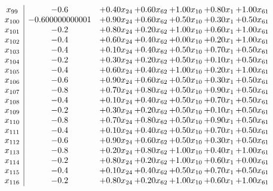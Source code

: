\documentclass[8pt]{article}
\begin{document}
\[\begin{array}{c| c c@{\hskip 2pt} c@{\hskip 2pt} c@{\hskip 2pt} c@{\hskip 2pt} c@{\hskip 2pt} }
 x_{99}   &  -0.6 & +  0.40 x_{24} & +  0.60 x_{62} & +  1.00 x_{10} & +  0.80 x_{1} & +  1.00 x_{61}\\
 x_{100}   &  -0.600000000001 & +  0.90 x_{24} & +  0.60 x_{62} & +  0.50 x_{10} & +  0.30 x_{1} & +  0.50 x_{61}\\
 x_{101}   &  -0.2 & +  0.80 x_{24} & +  0.20 x_{62} & +  1.00 x_{10} & +  0.60 x_{1} & +  1.00 x_{61}\\
 x_{102}   &  -0.4 & +  0.60 x_{24} & +  0.40 x_{62} & +  0.00 x_{10} & +  0.20 x_{1} & +  1.00 x_{61}\\
 x_{103}   &  -0.4 & +  0.10 x_{24} & +  0.40 x_{62} & +  0.50 x_{10} & +  0.70 x_{1} & +  0.50 x_{61}\\
 x_{104}   &  -0.2 & +  0.30 x_{24} & +  0.20 x_{62} & +  0.50 x_{10} & +  0.10 x_{1} & +  0.50 x_{61}\\
 x_{105}   &  -0.4 & +  0.60 x_{24} & +  0.40 x_{62} & +  1.00 x_{10} & +  0.20 x_{1} & +  1.00 x_{61}\\
 x_{106}   &  -0.6 & +  0.90 x_{24} & +  0.60 x_{62} & +  0.50 x_{10} & +  0.30 x_{1} & +  0.50 x_{61}\\
 x_{107}   &  -0.8 & +  0.70 x_{24} & +  0.80 x_{62} & +  0.50 x_{10} & +  0.90 x_{1} & +  0.50 x_{61}\\
 x_{108}   &  -0.4 & +  0.10 x_{24} & +  0.40 x_{62} & +  0.50 x_{10} & +  0.70 x_{1} & +  0.50 x_{61}\\
 x_{109}   &  -0.2 & +  0.30 x_{24} & +  0.20 x_{62} & +  0.50 x_{10} & +  0.10 x_{1} & +  0.50 x_{61}\\
 x_{110}   &  -0.8 & +  0.70 x_{24} & +  0.80 x_{62} & +  0.50 x_{10} & +  0.90 x_{1} & +  0.50 x_{61}\\
 x_{111}   &  -0.4 & +  0.10 x_{24} & +  0.40 x_{62} & +  0.50 x_{10} & +  0.70 x_{1} & +  0.50 x_{61}\\
 x_{112}   &  -0.6 & +  0.90 x_{24} & +  0.60 x_{62} & +  0.50 x_{10} & +  0.30 x_{1} & +  0.50 x_{61}\\
 x_{113}   &  -0.8 & +  0.20 x_{24} & +  0.80 x_{62} & +  1.00 x_{10} & +  0.40 x_{1} & +  1.00 x_{61}\\
 x_{114}   &  -0.2 & +  0.80 x_{24} & +  0.20 x_{62} & +  1.00 x_{10} & +  0.60 x_{1} & +  0.00 x_{61}\\
 x_{115}   &  -0.4 & +  0.10 x_{24} & +  0.40 x_{62} & +  0.50 x_{10} & +  0.70 x_{1} & +  0.50 x_{61}\\
 x_{116}   &  -0.2 & +  0.80 x_{24} & +  0.20 x_{62} & +  1.00 x_{10} & +  0.60 x_{1} & +  1.00 x_{61}\\

\end{array}\]
\end{document}
